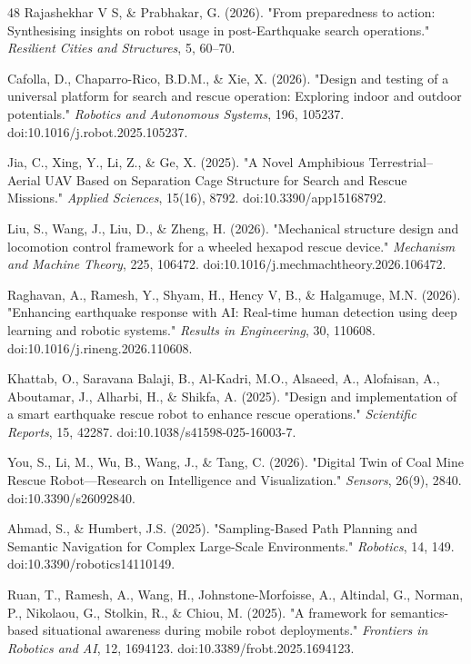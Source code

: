 \documentclass[journal]{IEEEtran}
\begin{document}
\begin{thebibliography}{48}
Rajashekhar V S, \& Prabhakar, G. (2026). "From preparedness to action: Synthesising insights on robot usage in post-Earthquake search operations." \textit{Resilient Cities and Structures}, 5, 60–70.

Cafolla, D., Chaparro-Rico, B.D.M., \& Xie, X. (2026). "Design and testing of a universal platform for search and rescue operation: Exploring indoor and outdoor potentials." \textit{Robotics and Autonomous Systems}, 196, 105237. doi:10.1016/j.robot.2025.105237.

Jia, C., Xing, Y., Li, Z., \& Ge, X. (2025). "A Novel Amphibious Terrestrial–Aerial UAV Based on Separation Cage Structure for Search and Rescue Missions." \textit{Applied Sciences}, 15(16), 8792. doi:10.3390/app15168792.

Liu, S., Wang, J., Liu, D., \& Zheng, H. (2026). "Mechanical structure design and locomotion control framework for a wheeled hexapod rescue device." \textit{Mechanism and Machine Theory}, 225, 106472. doi:10.1016/j.mechmachtheory.2026.106472.

Raghavan, A., Ramesh, Y., Shyam, H., Hency V, B., \& Halgamuge, M.N. (2026). "Enhancing earthquake response with AI: Real-time human detection using deep learning and robotic systems." \textit{Results in Engineering}, 30, 110608. doi:10.1016/j.rineng.2026.110608.

Khattab, O., Saravana Balaji, B., Al-Kadri, M.O., Alsaeed, A., Alofaisan, A., Aboutamar, J., Alharbi, H., \& Shikfa, A. (2025). "Design and implementation of a smart earthquake rescue robot to enhance rescue operations." \textit{Scientific Reports}, 15, 42287. doi:10.1038/s41598-025-16003-7.

You, S., Li, M., Wu, B., Wang, J., \& Tang, C. (2026). "Digital Twin of Coal Mine Rescue Robot—Research on Intelligence and Visualization." \textit{Sensors}, 26(9), 2840. doi:10.3390/s26092840.

Ahmad, S., \& Humbert, J.S. (2025). "Sampling-Based Path Planning and Semantic Navigation for Complex Large-Scale Environments." \textit{Robotics}, 14, 149. doi:10.3390/robotics14110149.

Ruan, T., Ramesh, A., Wang, H., Johnstone-Morfoisse, A., Altindal, G., Norman, P., Nikolaou, G., Stolkin, R., \& Chiou, M. (2025). "A framework for semantics-based situational awareness during mobile robot deployments." \textit{Frontiers in Robotics and AI}, 12, 1694123. doi:10.3389/frobt.2025.1694123.


\end{thebibliography}
\end{document}
